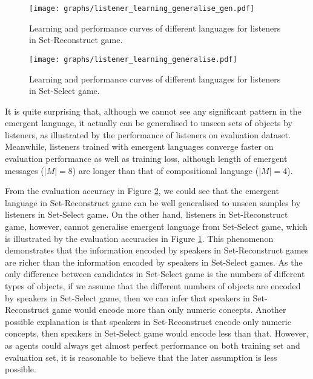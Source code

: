 \begin{figure}[!h]
    \centering
    \texttt{[image: graphs/listener\_learning\_generalise\_gen.pdf]}
    \caption{Learning and performance curves of different languages for listeners in Set-Reconstruct game.}
    \label{fig4.0:listener_learning_generalise_gen}
\end{figure}

\begin{figure}[!h]
    \centering
    \texttt{[image: graphs/listener\_learning\_generalise.pdf]}
    \caption{Learning and performance curves of different languages for listeners in Set-Select game.}
    \label{fig4.00:listener_learning_generalise_ref}
\end{figure}

It is quite surprising that, although we cannot see any significant pattern in the emergent language, it actually can be generalised to unseen sets of objects by listeners, as illustrated by the performance of listeners on evaluation dataset. Meanwhile, listeners trained with emergent languages converge faster on evaluation performance as well as training loss, although length of emergent messages ($|M|=8$) are longer than that of compositional language ($|M|=4$).

From the evaluation accuracy in Figure \ref{fig4.00:listener_learning_generalise_ref}, we could see that the emergent language in Set-Reconstruct game can be well generalised to unseen samples by listeners in Set-Select game. On the other hand, listeners in Set-Reconstruct game, however, cannot generalise emergent language from Set-Select game, which is illustrated by the evaluation accuracies in Figure \ref{fig4.0:listener_learning_generalise_gen}. This phenomenon demonstrates that the information encoded by speakers in Set-Reconstruct games are richer than the information encoded by speakers in Set-Select games. As the only difference between candidates in Set-Select game is the numbers of different types of objects, if we assume that the different numbers of objects are encoded by speakers in Set-Select game, then we can infer that speakers in Set-Reconstruct game would encode more than only numeric concepts. Another possible explanation is that speakers in Set-Reconstruct encode only numeric concepts, then speakers in Set-Select game would encode less than that. However, as agents could always get almost perfect performance on both training set and evaluation set, it is reasonable to believe that the later assumption is less possible.

